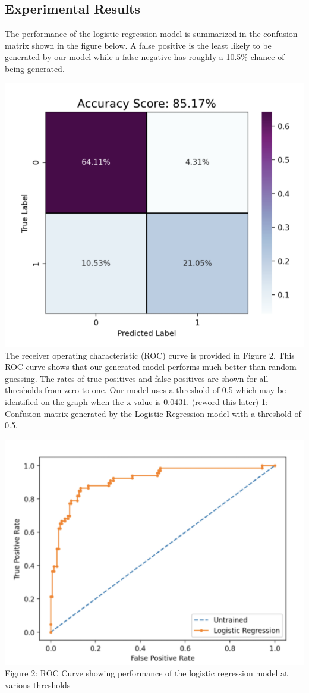 \documentclass{article}
\begin{document}
\subsection*{Experimental Results}

The performance of the logistic regression model is summarized in the confusion matrix shown in the figure below. A false positive is the least likely to be generated by our model while a false negative has roughly a 10.5\% chance of being generated. 

\includegraphics[scale=.5]{chart3.png}\\

The receiver operating characteristic (ROC) curve is provided in Figure 2. This ROC curve shows that our generated model performs much better than random guessing. The rates of true positives and false positives are shown for all thresholds from zero to one. Our model uses a threshold of 0.5 which may be identified on the graph when the x value is 0.0431. (reword this later)
 1: Confusion matrix generated by the Logistic Regression model with a threshold of 0.5.
 
 \includegraphics[scale=.4]{chart4.png}\\
 Figure 2: ROC Curve showing performance of the logistic regression model at various thresholds
\end{document}
